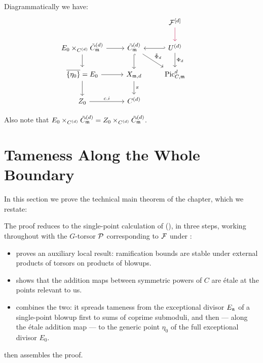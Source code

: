 Diagrammatically we have:
\[
\begin{tikzcd}
    &  & \cF^{[d]} \arrow[d, purple]\\
    E_0 \times_{C^{(d)}} \Cmod{d} \arrow[d] \arrow[r]  & \Cmod{d} \arrow[d, hook] \arrow[rd, "\tilde{\Phi}_d"]  & U^{(d)} \arrow[l, hook'] \arrow[d, "\Phi_d"] \\
\overline{\{\eta_0 \}} =  E_0 \arrow[r] \arrow[d] &
X_{\mdls, d} \arrow[d, "\pi"]  &  \PicCm[d] &  \\
Z_0 \arrow[r, "c.i"]           & C^{(d)}
\end{tikzcd}
\]

Also note that $ E_0 \times_{C^{(d)}} \tilde{C}_{\mathfrak{m}}^{(d)} = Z_0 \times_{C^{(d)}} \tilde{C}_{\mathfrak{m}}^{(d)}$.


\section{Tameness Along the Whole Boundary}\label{section:tameness_along_boundary}

In this section we prove the technical main theorem of the chapter, which we
restate:

\SymmetricPowerOfSheafIsTamelyRamified*

The proof reduces  to
the single-point calculation of
(), in three steps, working
throughout with the $G$-torsor $\mathcal{P}$ corresponding to $\mathcal{F}$ under
:
\begin{itemize}
    \item {} proves an auxiliary local
    result: ramification bounds are stable under external products of
    torsors on products of blowups.
    \item {} shows that the addition
    maps between symmetric powers of $C$ are \'etale at the points relevant
    to us.
    \item {} combines the two: it spreads
    tameness from the exceptional divisor $E_{\mathfrak{n}}$ of a single-point blowup
    first to sums of coprime submoduli, and then --- along the \'etale
    addition map --- to the generic point $\eta_0$ of the full exceptional
    divisor $E_0$.
\end{itemize}
 then assembles the proof.

